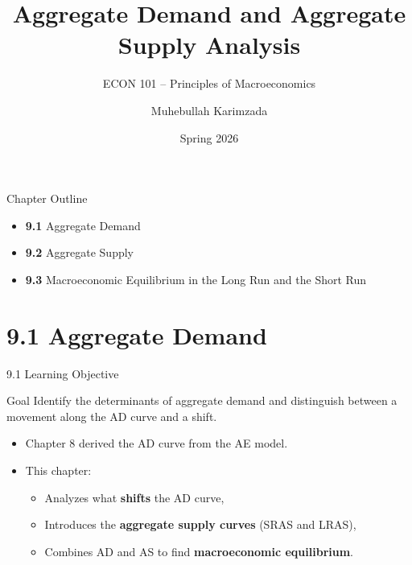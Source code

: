 \documentclass[aspectratio=169]{beamer}
\title{\textbf{Aggregate Demand and Aggregate Supply Analysis}}
\subtitle{{\large ECON 101 -- Principles of Macroeconomics}}
\author{Muhebullah Karimzada}
\date{Spring 2026}
\begin{document}

\begin{frame}[plain]
  \titlepage
\end{frame}

\begin{frame}{Chapter Outline}
\transfade
\begin{itemize}
  \item \textbf{9.1} Aggregate Demand
  \item \textbf{9.2} Aggregate Supply
  \item \textbf{9.3} Macroeconomic Equilibrium in the Long Run and the Short Run
\end{itemize}
\end{frame}

\section{9.1 Aggregate Demand}

\begin{frame}{9.1 Learning Objective}
\transfade
\begin{block}{Goal}
Identify the determinants of aggregate demand and distinguish between a movement along the AD curve and a shift.
\end{block}
\begin{itemize}
  \item Chapter 8 derived the AD curve from the AE model.
  \item This chapter:
  \begin{itemize}
    \item Analyzes what \textbf{shifts} the AD curve,
    \item Introduces the \textbf{aggregate supply curves} (SRAS and LRAS),
    \item Combines AD and AS to find \textbf{macroeconomic equilibrium}.
  \end{itemize}
\end{itemize}
\end{frame}
\end{document}
